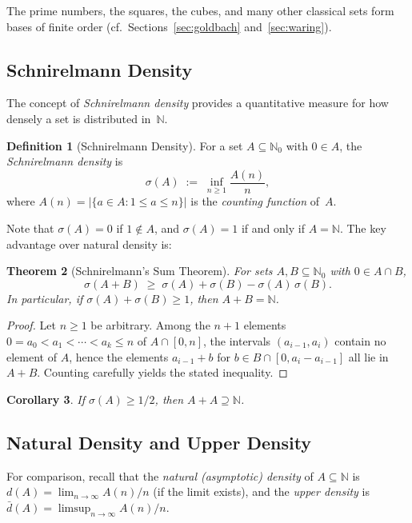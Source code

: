 \documentclass[12pt,a4paper]{amsart}
\newtheorem{theorem}{Theorem}[section]
\newtheorem{corollary}[theorem]{Corollary}
\theoremstyle{definition}
\newtheorem{definition}[theorem]{Definition}
\newcommand{\N}{\mathbb{N}}
\newcommand{\abs}[1]{\left|#1\right|}
\begin{document}
The prime numbers, the squares, the cubes, and many other classical sets
form bases of finite order (cf.\ Sections~\ref{sec:goldbach}
and~\ref{sec:waring}).

\subsection{Schnirelmann Density}

The concept of \emph{Schnirelmann density} provides a quantitative
measure for how densely a set is distributed in~$\N$.

\begin{definition}[Schnirelmann Density]\label{def:schnirelmann-density}
For a set $A \subseteq \N_0$ with $0 \in A$, the \emph{Schnirelmann density}
is
\[
  \sigma(A) \;:=\; \inf_{n \geq 1} \frac{A(n)}{n},
\]
where $A(n) = \abs{\{a \in A : 1 \leq a \leq n\}}$ is the \emph{counting
function} of~$A$.
\end{definition}

Note that $\sigma(A) = 0$ if $1 \notin A$, and $\sigma(A) = 1$ if and
only if $A = \N$.  The key advantage over natural density is:

\begin{theorem}[Schnirelmann's Sum Theorem]\label{thm:schnirelmann-sum}
For sets $A, B \subseteq \N_0$ with $0 \in A \cap B$,
\[
  \sigma(A + B) \;\geq\; \sigma(A) + \sigma(B) - \sigma(A)\,\sigma(B).
\]
In particular, if $\sigma(A) + \sigma(B) \geq 1$, then $A + B = \N$.
\end{theorem}

\begin{proof}
Let $n \geq 1$ be arbitrary.  Among the $n + 1$ elements
$0 = a_0 < a_1 < \cdots < a_k \leq n$ of $A \cap [0,n]$, the
intervals $(a_{i-1}, a_i)$ contain no element of $A$, hence the elements
$a_{i-1} + b$ for $b \in B \cap [0, a_i - a_{i-1}]$ all lie in $A + B$.
Counting carefully yields the stated inequality.
\end{proof}

\begin{corollary}\label{cor:density-one}
If $\sigma(A) \geq 1/2$, then $A + A \supseteq \N$.
\end{corollary}

\subsection{Natural Density and Upper Density}

For comparison, recall that the \emph{natural (asymptotic) density} of
$A \subseteq \N$ is $d(A) = \lim_{n \to \infty} A(n)/n$ (if the limit
exists), and the \emph{upper density} is
$\bar d(A) = \limsup_{n \to \infty} A(n)/n$.
\end{document}
